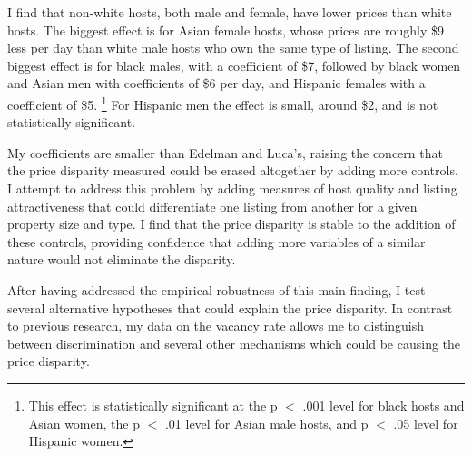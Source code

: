 I find that non-white hosts, both male and female, have lower prices than white hosts. The biggest effect is for Asian female hosts, whose prices are roughly \$9 less per day than white male hosts who own the same type of listing. The second biggest effect is for black males, with a coefficient of \$7, followed by black women and Asian men with coefficients of \$6 per day, and Hispanic females with a coefficient of \$5.%
	\footnote{This effect is statistically significant at the p $<$ .001 level for black hosts and Asian women, the p $<$ .01 level for Asian male hosts, and p $<$ .05 level for Hispanic women.} 
For Hispanic men the effect is small, around \$2, and is not statistically significant.

My coefficients are smaller than Edelman and Luca's, raising the concern that the price disparity measured could be erased altogether by adding more controls. I attempt to address this problem by adding measures of host quality and listing attractiveness that could differentiate one listing from another for a given property size and type. I find that the price disparity is stable to the addition of these controls, providing confidence that adding more variables of a similar nature would not eliminate the disparity. 

After having addressed the empirical robustness of this main finding, I test several alternative hypotheses that could explain the price disparity. In contrast to previous research, my data on the vacancy rate allows me to distinguish between discrimination and several other mechanisms which could be causing the price disparity. 

